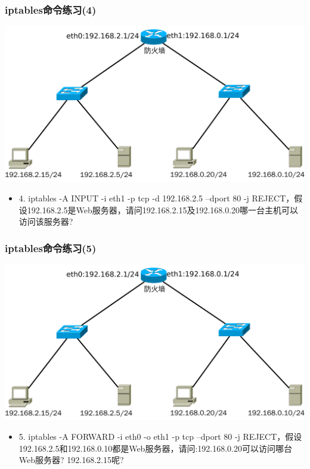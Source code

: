 \documentclass[xcolor=svgnames,presentation]{beamer}
\begin{document}
\begin{frame}
\frametitle{iptables命令练习(4)}
\label{sec-2-32}
\label{sec-2-32-1}

\includegraphics[width=.9\linewidth]{img/iptables-test.pdf}
\begin{itemize}

\item 4. iptables -A INPUT -i eth1 -p tcp -d 192.168.2.5 --dport 80 -j REJECT，假设192.168.2.5是Web服务器，请问192.168.2.15及192.168.0.20哪一台主机可以访问该服务器?
\label{sec-2-32-2}%
\end{itemize} %
\end{frame}
\begin{frame}
\frametitle{iptables命令练习(5)}
\label{sec-2-33}
\label{sec-2-33-1}

\includegraphics[width=.9\linewidth]{img/iptables-test.pdf}
\begin{itemize}

\item 5. iptables -A FORWARD -i eth0 -o eth1 -p tcp --dport 80 -j REJECT，假设192.168.2.5和192.168.0.10都是Web服务器，请问:192.168.0.20可以访问哪台Web服务器? 192.168.2.15呢?
\label{sec-2-33-2}%
\end{itemize} %
\end{frame}
\end{document}
